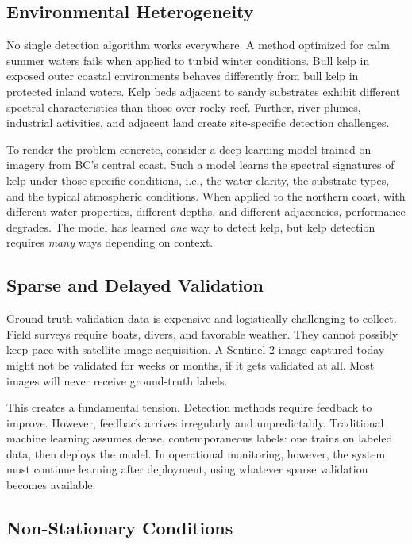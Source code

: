 \documentclass[11pt,a4paper]{article}
\begin{document}
\subsection{Environmental Heterogeneity}

No single detection algorithm works everywhere. A method optimized for calm summer waters fails when applied to turbid winter conditions. Bull kelp in exposed outer coastal environments behaves differently from bull kelp in protected inland waters. Kelp beds adjacent to sandy substrates exhibit different spectral characteristics than those over rocky reef. Further, river plumes, industrial activities, and adjacent land create site-specific detection challenges.

To render the problem concrete, consider a deep learning model trained on imagery from BC's central coast. Such a model learns the spectral signatures of kelp under those specific conditions, i.e., the water clarity, the substrate types, and the typical atmospheric conditions. When applied to the northern coast, with different water properties, different depths, and different adjacencies, performance degrades. The model has learned \emph{one} way to detect kelp, but kelp detection requires \emph{many} ways depending on context.

\subsection{Sparse and Delayed Validation}

Ground-truth validation data is expensive and logistically challenging to collect. Field surveys require boats, divers, and favorable weather. They cannot possibly keep pace with satellite image acquisition. A Sentinel-2 image captured today might not be validated for weeks or months, if it gets validated at all. Most images will never receive ground-truth labels.

This creates a fundamental tension. Detection methods require feedback to improve. However, feedback arrives irregularly and unpredictably. Traditional machine learning assumes dense, contemporaneous labels: one trains on labeled data, then deploys the model. In operational monitoring, however, the system must continue learning after deployment, using whatever sparse validation becomes available.

\subsection{Non-Stationary Conditions}
\end{document}
